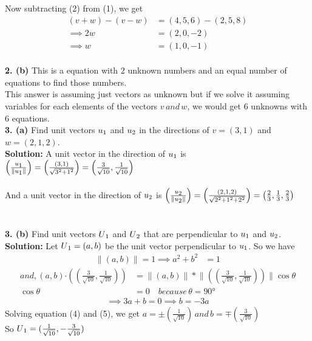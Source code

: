 \documentclass{article}
\begin{document}
Now subtracting (2) from (1), we get
\begin{align*}
   (v+w)-(v-w) &= \left(4, 5, 6\right) - \left(2, 5, 8\right)\\
\implies 2w &= (2,0,-2)\\
\implies w &= (1,0,-1)
\end{align*}\\


\textbf{2. (b)} This is a equation with \textbf{$2$} unknown numbers and an equal number of equations to find those numbers.\\This answer is assuming just vectors as unknown but if we solve it assuming variables for each elements of the vectors $v\, and\, w$, we would get 6 unknowns with 6 equations.\\

\textbf{3. (a)} Find unit vectors $u\textsubscript{1}$  and  $u\textsubscript{2}$ in the directions of $v = (3,1)$ and $w =(2,1,2)$. \\
\textbf{Solution:} 
A unit vector in the direction of $u\textsubscript{1}$ is $\left(\frac{u\textsubscript{1}}{\lVert u\textsubscript{1}\rVert }\right) = \left(\frac{(3,1)}{\sqrt{3^2+1^2}}\right) = \left(\frac{3}{\sqrt{10}},\frac{1}{\sqrt{10}}\right)$\\ \\
And a unit vector in the direction of $u\textsubscript{2}$ is $\left(\frac{u\textsubscript{2}}{\lVert u\textsubscript{2}\rVert }\right) = \left(\frac{(2,1,2)}{\sqrt{2^2+1^2+2^2}}\right) = \left(\frac{2}{3},\frac{1}{3},\frac{2}{3}\right)$\\ \\
\\
\textbf{3. (b)} Find unit vectors $U\textsubscript{1}$ and $U\textsubscript{2}$ that are perpendicular to $u\textsubscript{1}$  and  $u\textsubscript{2}$.
\textbf{Solution:} Let $U\textsubscript{1}=(a,b)$ be the unit vector perpendicular to $u\textsubscript{1}$. So we have 
\begin{align}
\lVert (a,b)\rVert = 1 \implies a^2+b^2&=1
\end{align}
\begin{align*}
and, (a,b)\boldsymbol{\cdot}(\left(\frac{3}{\sqrt{10}},\frac{1}{\sqrt{10}}\right))&=\lVert (a,b)\rVert * \lVert (\left(\frac{3}{\sqrt{10}},\frac{1}{\sqrt{10}}\right))\rVert \cos\theta \\
\cos\theta&= 0 \quad because\, \theta =\ang{90}
\end{align*}
\begin{align}
\implies 3a+b=0  \implies b= -3a
\end{align}
Solving equation (4) and (5), we get $a = \pm(\frac{1}{\sqrt{10}})\, and \, b=\mp\left(\frac{3}{\sqrt{10}}\right) $\\
So $U\textsubscript{1}=(\frac{1}{\sqrt{10}},-\frac{3}{\sqrt{10}})$\\
\end{document}

